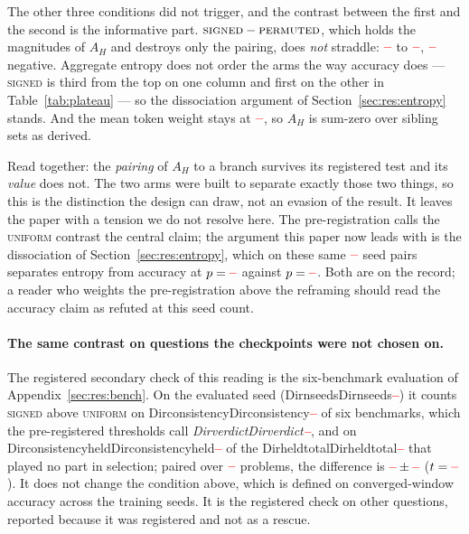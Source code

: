 \documentclass[11pt]{article}
\newcommand{\AH}{A_{H}}
\providecommand{\PENDING}{\textcolor{red}{\textbf{--}}}
\newcommand{\num}[1]{\ifcsname #1\endcsname\csname #1\endcsname\else\PENDING\fi}
\begin{document}
The other three conditions did not trigger, and the contrast between the first and
the second is the informative part. $\textsc{signed} - \textsc{permuted}$, which
holds the magnitudes of $\AH$ and destroys only the pairing, does \emph{not} straddle:
$\num{CLosignedpermutedacc}$ to $\num{CHisignedpermutedacc}$,
$\num{CNegsignedpermutedacc}$ negative. Aggregate entropy does not order the arms the
way accuracy does --- \textsc{signed} is third from the top on one column and first on the
other in Table~\ref{tab:plateau} --- so the dissociation argument of
Section~\ref{sec:res:entropy} stands. And the mean token weight stays at
$\num{Rsignedtwmean}$, so $\AH$ is sum-zero over sibling sets as derived.

Read together: the \emph{pairing} of $\AH$ to a branch survives its registered test
and its \emph{value} does not. The two arms were built to separate exactly those two
things, so this is the distinction the design can draw, not an evasion of the
result. It leaves the paper with a tension we do not resolve here. The
pre-registration calls the \textsc{uniform} contrast the central claim; the argument
this paper now leads with is the dissociation of Section~\ref{sec:res:entropy}, which
on these same $\num{Nsignedgrpo}$ seed pairs separates entropy from accuracy at
$p = \num{Psignedgrpoentropy}$ against $p = \num{Psignedgrpoacc}$. Both are on the
record; a reader who weights the pre-registration above the reframing should read the
accuracy claim as refuted at this seed count.

\paragraph{The same contrast on questions the checkpoints were not chosen on.} The
registered secondary check of this reading is the six-benchmark evaluation of
Appendix~\ref{sec:res:bench}. On the evaluated seed (\num{Dirnseeds}) it counts
\textsc{signed} above \textsc{uniform} on \num{Dirconsistency} of six benchmarks, which the
pre-registered thresholds call \emph{\num{Dirverdict}}, and on
\num{Dirconsistencyheld} of the \num{Dirheldtotal} that played no part in selection;
paired over $\num{Pairn}$ problems, the difference is
$\num{Pairsigneduniform} \pm \num{Pairsigneduniformse}$
($t = \num{Pairsigneduniformt}$). It does not change the condition above, which is
defined on converged-window accuracy across the training seeds. It is the registered
check on other questions, reported because it was registered and not as a rescue.
\end{document}
